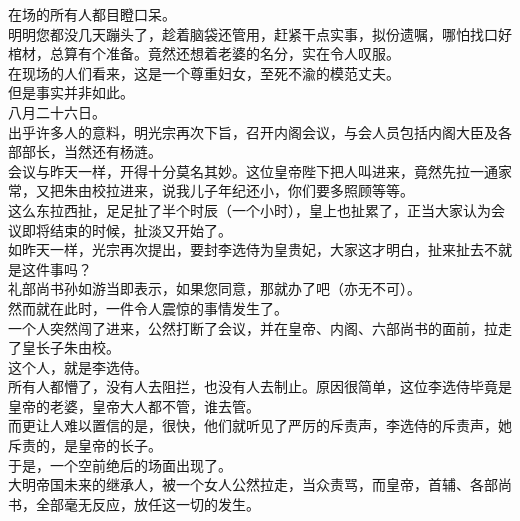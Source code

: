 \begin{multicols}{\theparacolNo}
在场的所有人都目瞪口呆。\\

明明您都没几天蹦头了，趁着脑袋还管用，赶紧干点实事，拟份遗嘱，哪怕找口好棺材，总算有个准备。竟然还想着老婆的名分，实在令人叹服。\\

在现场的人们看来，这是一个尊重妇女，至死不渝的模范丈夫。\\

但是事实并非如此。\\

八月二十六日。\\

出乎许多人的意料，明光宗再次下旨，召开内阁会议，与会人员包括内阁大臣及各部部长，当然还有杨涟。\\

会议与昨天一样，开得十分莫名其妙。这位皇帝陛下把人叫进来，竟然先拉一通家常，又把朱由校拉进来，说我儿子年纪还小，你们要多照顾等等。\\

这么东拉西扯，足足扯了半个时辰（一个小时），皇上也扯累了，正当大家认为会议即将结束的时候，扯淡又开始了。\\

如昨天一样，光宗再次提出，要封李选侍为皇贵妃，大家这才明白，扯来扯去不就是这件事吗？\\

礼部尚书孙如游当即表示，如果您同意，那就办了吧（亦无不可）。\\

然而就在此时，一件令人震惊的事情发生了。\\

一个人突然闯了进来，公然打断了会议，并在皇帝、内阁、六部尚书的面前，拉走了皇长子朱由校。\\

这个人，就是李选侍。\\

所有人都懵了，没有人去阻拦，也没有人去制止。原因很简单，这位李选侍毕竟是皇帝的老婆，皇帝大人都不管，谁去管。\\

而更让人难以置信的是，很快，他们就听见了严厉的斥责声，李选侍的斥责声，她斥责的，是皇帝的长子。\\

于是，一个空前绝后的场面出现了。\\

大明帝国未来的继承人，被一个女人公然拉走，当众责骂，而皇帝，首辅、各部尚书，全部毫无反应，放任这一切的发生。\\


\end{multicols}
